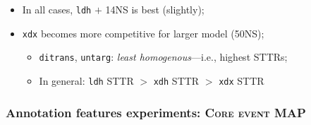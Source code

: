 \documentclass[xcolor={dvipsnames}]{beamer}
\newcommand{\feat}[1]{\textsc{#1}}
\newcommand{\param}[1]{\texttt{#1}}
\begin{document}
\begin{frame}
\begin{itemize}
\item In all cases, \param{ldh} $+$ 14NS is best (slightly);
\item \param{xdx} becomes more competitive for larger model (50NS);
\begin{itemize}
\item \param{ditrans}, \param{untarg}: \textit{least homogenous}---i.e., highest STTRs;
\item In general: \param{ldh} STTR $>$ \param{xdh} STTR $>$ \param{xdx} STTR
\end{itemize}
\end{itemize}

\end{frame}

\begin{frame}
\frametitle{Annotation features experiments: \feat{Core event} MAP}


\end{frame}
\end{document}
